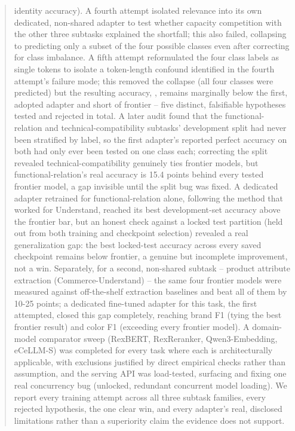 \documentclass{article}
\begin{document}
\begin{abstract}
\EcellmIdentityAcc{} identity accuracy). A fourth attempt isolated relevance into its own dedicated, non-shared adapter to test whether capacity competition with the other three subtasks explained the shortfall; this also failed, collapsing to predicting only a subset of the four possible classes even after correcting for class imbalance. A fifth attempt reformulated the four class labels as single tokens to isolate a token-length confound identified in the fourth attempt's failure mode; this removed the collapse (all four classes were predicted) but the resulting accuracy, \SingleTokenRelevanceAcc{}, remains marginally below the first, adopted adapter and short of frontier -- five distinct, falsifiable hypotheses tested and rejected in total. A later audit found that the functional-relation and technical-compatibility subtasks' development split had never been stratified by label, so the first adapter's reported perfect accuracy on both had only ever been tested on one class each; correcting the split revealed technical-compatibility genuinely ties frontier models, but functional-relation's real accuracy is 15.4 points behind every tested frontier model, a gap invisible until the split bug was fixed. A dedicated adapter retrained for functional-relation alone, following the method that worked for Understand, reached its best development-set accuracy above the frontier bar, but an honest check against a locked test partition (held out from both training and checkpoint selection) revealed a real generalization gap: the best locked-test accuracy across every saved checkpoint remains below frontier, a genuine but incomplete improvement, not a win. Separately, for a second, non-shared subtask -- product attribute extraction (Commerce-Understand) -- the same four frontier models were measured against off-the-shelf extraction baselines and beat all of them by 10-25 points; a dedicated fine-tuned adapter for this task, the first attempted, closed this gap completely, reaching \UnderstandAdapterBrandFOne{} brand F1 (tying the best frontier result) and \UnderstandAdapterColorFOne{} color F1 (exceeding every frontier model). A domain-model comparator sweep (RexBERT, RexReranker, Qwen3-Embedding, eCeLLM-S) was completed for every task where each is architecturally applicable, with exclusions justified by direct empirical checks rather than assumption, and the serving API was load-tested, surfacing and fixing one real concurrency bug (unlocked, redundant concurrent model loading). We report every training attempt across all three subtask families, every rejected hypothesis, the one clear win, and every adapter's real, disclosed limitations rather than a superiority claim the evidence does not support.
\end{abstract}
\end{document}
